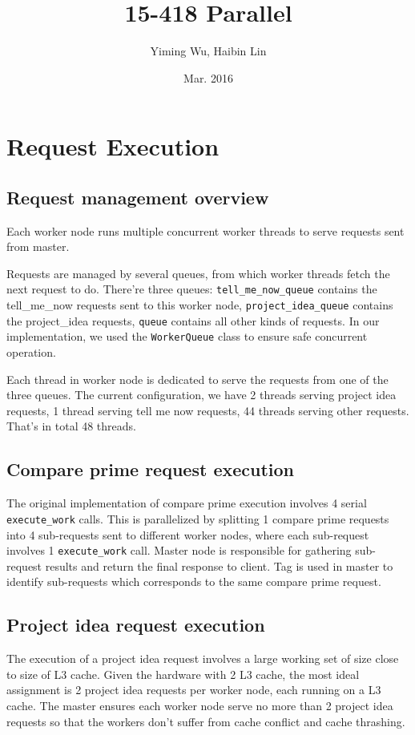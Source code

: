 \documentclass[11pt]{article}
\title{15-418 Parallel}
\author{Yiming Wu, Haibin Lin}
\date{Mar. 2016}
\newcommand{\code}[1]{\texttt{#1}}
\begin{document}
\maketitle

\section{Request Execution} %
\label{sec:work_execution}

\subsection{Request management overview} %
\label{sub:request_management_overview}
Each worker node runs multiple concurrent worker threads to serve requests sent from master. 

Requests are managed by several queues, from which worker threads fetch the next request to do. There're three queues: \code{tell\_me\_now\_queue} contains the tell\_me\_now requests sent to this worker node, \code{project\_idea\_queue} contains the project\_idea requests, \code{queue} contains all other kinds of requests. In our implementation, we used the \code{WorkerQueue} class to ensure safe concurrent operation. 

Each thread in worker node is dedicated to serve the requests from one of the three queues. The current configuration, we have 2 threads serving project idea requests, 1 thread serving 	tell me now requests, 44 threads serving other requests. That's in total 48 threads. 

\subsection{Compare prime request execution} %
\label{sub:compare_prime_execution}
The original implementation of compare prime execution involves 4 serial \code{execute\_work} calls. This is parallelized by splitting 1 compare prime requests into 4 sub-requests sent to different worker nodes, where each sub-request involves 1 \code{execute\_work} call. Master node is responsible for gathering sub-request results and return the final response to client. Tag is used in master to identify sub-requests which corresponds to the same compare prime request. 

\subsection{Project idea request execution} %
\label{sub:project_idea_execution}
The execution of a project idea request involves a large working set of size close to size of L3 cache. Given the hardware with 2 L3 cache, the most ideal assignment is 2 project idea requests per worker node, each running on a L3 cache. The master ensures each worker node serve no more than 2 project idea requests so that the workers don't suffer from cache conflict and cache thrashing. 
\end{document}
